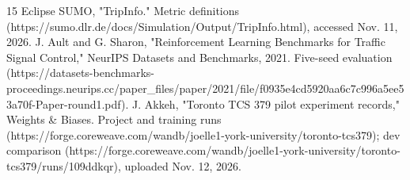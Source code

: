 \documentclass[conference]{IEEEtran}
\begin{document}
\begin{thebibliography}{15}
 Eclipse SUMO, "TripInfo." Metric definitions (https://sumo.dlr.de/docs/Simulation/Output/TripInfo.html), accessed Nov. 11, 2026.
 J. Ault and G. Sharon, "Reinforcement Learning Benchmarks for Traffic Signal Control," NeurIPS Datasets and Benchmarks, 2021. Five-seed evaluation (https://datasets-benchmarks-proceedings.neurips.cc/paper\_files/paper/2021/file/f0935e4cd5920aa6c7c996a5ee53a70f-Paper-round1.pdf).
 J. Akkeh, "Toronto TCS 379 pilot experiment records," Weights \& Biases. Project and training runs (https://forge.coreweave.com/wandb/joelle1-york-university/toronto-tcs379); dev comparison (https://forge.coreweave.com/wandb/joelle1-york-university/toronto-tcs379/runs/109ddkqr), uploaded Nov. 12, 2026.
\end{thebibliography}
\end{document}
